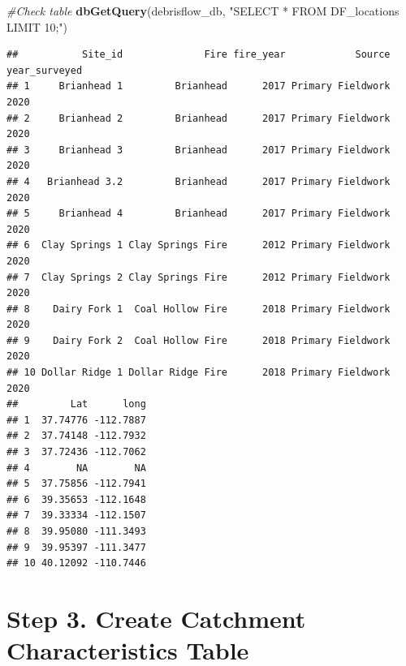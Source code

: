 \documentclass[
]{book}
\newenvironment{Shaded}{\begin{snugshade}}{\end{snugshade}}
\newcommand{\CommentTok}[1]{\textcolor[rgb]{0.56,0.35,0.01}{\textit{#1}}}
\newcommand{\KeywordTok}[1]{\textcolor[rgb]{0.13,0.29,0.53}{\textbf{#1}}}
\newcommand{\NormalTok}[1]{#1}
\newcommand{\StringTok}[1]{\textcolor[rgb]{0.31,0.60,0.02}{#1}}
\begin{document}
\begin{Shaded}
\begin{Highlighting}[]
\CommentTok{#Check table}
\KeywordTok{dbGetQuery}\NormalTok{(debrisflow_db, }\StringTok{"SELECT * FROM DF_locations LIMIT 10;"}\NormalTok{)}
\end{Highlighting}
\end{Shaded}

\begin{verbatim}
##           Site_id              Fire fire_year            Source year_surveyed
## 1     Brianhead 1         Brianhead      2017 Primary Fieldwork          2020
## 2     Brianhead 2         Brianhead      2017 Primary Fieldwork          2020
## 3     Brianhead 3         Brianhead      2017 Primary Fieldwork          2020
## 4   Brianhead 3.2         Brianhead      2017 Primary Fieldwork          2020
## 5     Brianhead 4         Brianhead      2017 Primary Fieldwork          2020
## 6  Clay Springs 1 Clay Springs Fire      2012 Primary Fieldwork          2020
## 7  Clay Springs 2 Clay Springs Fire      2012 Primary Fieldwork          2020
## 8    Dairy Fork 1  Coal Hollow Fire      2018 Primary Fieldwork          2020
## 9    Dairy Fork 2  Coal Hollow Fire      2018 Primary Fieldwork          2020
## 10 Dollar Ridge 1 Dollar Ridge Fire      2018 Primary Fieldwork          2020
##         Lat      long
## 1  37.74776 -112.7887
## 2  37.74148 -112.7932
## 3  37.72436 -112.7062
## 4        NA        NA
## 5  37.75856 -112.7941
## 6  39.35653 -112.1648
## 7  39.33334 -112.1507
## 8  39.95080 -111.3493
## 9  39.95397 -111.3477
## 10 40.12092 -110.7446
\end{verbatim}

\hypertarget{step-3.-create-catchment-characteristics-table}{%
\section{Step 3. Create Catchment Characteristics Table}\label{step-3.-create-catchment-characteristics-table}}
\end{document}
